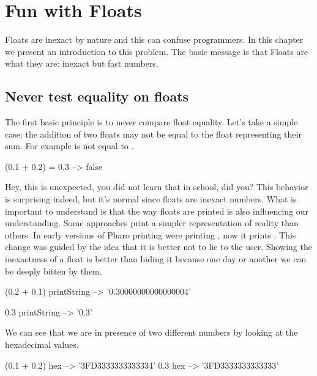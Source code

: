 \documentclass[a4paper,10pt,twoside]{book}
\begin{document}
\fi
\sloppy

\chapter{Fun with Floats}
\chapterauthor{\authornicolas{}}

Floats are inexact by nature and this can confuse programmers. In this chapter we present 
an introduction to this problem. The basic message is that Floats are what they are: inexact but fast numbers.


\section{Never test equality on floats}
The first basic principle is to never compare float equality. 
Let's take a simple case: the addition of two floats may not be equal to the float representing their
sum. For example  is not equal to .

\begin{code}{}
(0.1 + 0.2) = 0.3
	--> false
\end{code}

Hey, this is unexpected, you did not learn that in school, did you? This behavior is surprising indeed, but it's normal since floats are inexact numbers. What is important to understand is that the way floats are printed is also influencing our understanding. Some approaches print a simpler representation of reality than others. In early versions of Pharo printing  were printing , now it prints .
This change was guided by the idea that it is better not to lie to the user. Showing the inexactness of a float is better than hiding it because one day or another we can be deeply bitten by them. 

\begin{code}{}
(0.2 + 0.1) printString
	--> '0.30000000000000004' 

0.3 printString
	-->	'0.3'
\end{code}	

We can see that we are in presence of two different numbers by looking at the hexadecimal values. 

\begin{code}{}
(0.1 + 0.2) hex 
	--> '3FD3333333333334'
0.3 hex 
	--> '3FD3333333333333' 
\end{code}
\end{document}
